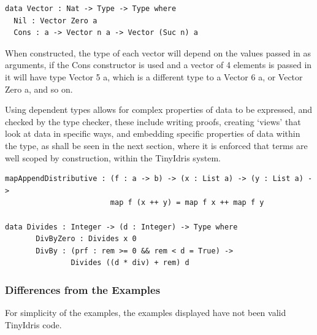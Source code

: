 \documentclass[a4paper]{article}
\begin{document}
\begin{center}
\begin{verbatim}
data Vector : Nat -> Type -> Type where
  Nil : Vector Zero a
  Cons : a -> Vector n a -> Vector (Suc n) a
\end{verbatim}
\end{center}

When constructed, the type of each vector will depend on the values 
passed in as arguments, if the Cons constructor is used and a vector of 
4 elements is passed in it will have type Vector 5 a, which is a 
different type to a Vector 6 a, or Vector Zero a, and so on. 

Using dependent types allows for complex properties of data to be 
expressed, and checked by the type checker, these include writing
proofs, creating `views' that look at data in specific ways,
and embedding specific properties of data within the type, as shall be 
seen in the next section, where it is enforced that terms are well 
scoped by construction, within the TinyIdris system. 

\begin{center}
\begin{verbatim}
mapAppendDistributive : (f : a -> b) -> (x : List a) -> (y : List a) ->
						map f (x ++ y) = map f x ++ map f y

data Divides : Integer -> (d : Integer) -> Type where
	   DivByZero : Divides x 0
	   DivBy : (prf : rem >= 0 && rem < d = True) ->
			   Divides ((d * div) + rem) d
\end{verbatim}
\end{center}

\clearpage

\subsubsection{Differences from the Examples}
\label{sec:orgcd8bb18}

For simplicity of the examples, the examples displayed have not been 
valid TinyIdris code. 
\end{document}
